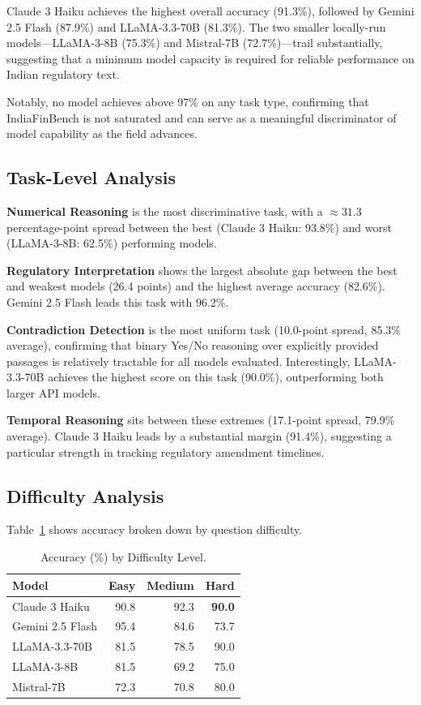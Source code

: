 \documentclass[11pt]{article}
\begin{document}
Claude 3 Haiku achieves the highest overall accuracy (91.3\%), followed by
Gemini 2.5 Flash (87.9\%) and LLaMA-3.3-70B (81.3\%). The two smaller
locally-run models---LLaMA-3-8B (75.3\%) and Mistral-7B (72.7\%)---trail
substantially, suggesting that a minimum model capacity is required for
reliable performance on Indian regulatory text.

Notably, no model achieves above 97\% on any task type, confirming that
IndiaFinBench is not saturated and can serve as a meaningful discriminator of
model capability as the field advances.

\subsection{Task-Level Analysis}

\textbf{Numerical Reasoning} is the most discriminative task, with a
${\approx}31.3$ percentage-point spread between the best (Claude 3 Haiku:
93.8\%) and worst (LLaMA-3-8B: 62.5\%) performing models.

\textbf{Regulatory Interpretation} shows the largest absolute gap between the
best and weakest models (26.4 points) and the highest average accuracy
(82.6\%). Gemini 2.5 Flash leads this task with 96.2\%.

\textbf{Contradiction Detection} is the most uniform task (10.0-point spread,
85.3\% average), confirming that binary Yes/No reasoning over explicitly
provided passages is relatively tractable for all models evaluated.
Interestingly, LLaMA-3.3-70B achieves the highest score on this task (90.0\%),
outperforming both larger API models.

\textbf{Temporal Reasoning} sits between these extremes (17.1-point spread,
79.9\% average). Claude 3 Haiku leads by a substantial margin (91.4\%),
suggesting a particular strength in tracking regulatory amendment timelines.

\subsection{Difficulty Analysis}

Table~\ref{tab:difficulty_results} shows accuracy broken down by question
difficulty.

\begin{table}[h]
\centering
\caption{Accuracy (\%) by Difficulty Level.}
\label{tab:difficulty_results}
\begin{tabular}{lrrr}
\toprule
\textbf{Model} & \textbf{Easy} & \textbf{Medium} & \textbf{Hard} \\
\midrule
Claude 3 Haiku    & 90.8 & 92.3 & \textbf{90.0} \\
Gemini 2.5 Flash  & 95.4 & 84.6 & 73.7 \\
LLaMA-3.3-70B     & 81.5 & 78.5 & 90.0 \\
LLaMA-3-8B        & 81.5 & 69.2 & 75.0 \\
Mistral-7B        & 72.3 & 70.8 & 80.0 \\
\bottomrule
\end{tabular}
\end{table}
\end{document}
